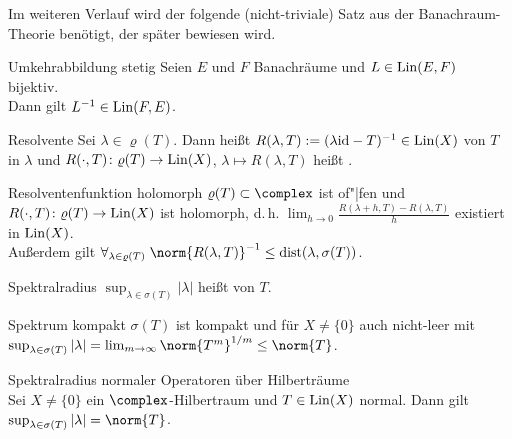 \linie

\begin{Bem}
    Im weiteren Verlauf wird der folgende (nicht-triviale) Satz aus der Banachraum-Theorie
    benötigt, der später bewiesen wird.
\end{Bem}

\begin{Satz}{Umkehrabbildung stetig}
    Seien $E$ und $F$ Banachräume und $L \in \operatorname{Lin}(E, F)$ bijektiv.\\
    Dann gilt $L^{-1} \in \operatorname{Lin}(F, E)$.
\end{Satz}

\begin{Def}{Resolvente}
    Sei $\lambda \in \varrho(T)$.
    Dann heißt $R(\lambda, T) := (\lambda\text{id} - T)^{-1} \in \operatorname{Lin}(X)$
     von $T$ in $\lambda$ und
    $R(\cdot, T)\colon \varrho(T) \rightarrow \operatorname{Lin}(X)$,
    $\lambda \mapsto R(\lambda, T)$ heißt .
\end{Def}


\begin{Satz}{Resolventenfunktion holomorph}
    $\varrho(T) \subset \complex$ ist of"|fen und
    $R(\cdot, T)\colon \varrho(T) \rightarrow \operatorname{Lin}(X)$ ist holomorph, d.\,h.
    $\lim_{h \to 0} \frac{R(\lambda + h, T) - R(\lambda, T)}{h}$ existiert in $\operatorname{Lin}(X)$.\\
    Außerdem gilt $\forall_{\lambda \in \varrho(T)}\;
    \norm{R(\lambda, T)}^{-1} \le \dist(\lambda, \sigma(T))$.
\end{Satz}

\linie

\begin{Def}{Spektralradius}
    $\sup_{\lambda \in \sigma(T)} |\lambda|$ heißt  von $T$.
\end{Def}

\begin{Satz}{Spektrum kompakt}
    $\sigma(T)$ ist kompakt und für $X \not= \{0\}$ auch nicht-leer mit\\
    $\sup_{\lambda \in \sigma(T)} |\lambda| = \lim_{m \to \infty} \norm{T^m}^{1/m} \le \norm{T}$.
\end{Satz}

\begin{Satz}{Spektralradius normaler Operatoren über Hilberträume}\\
    Sei $X \not= \{0\}$ ein $\complex$-Hilbertraum und
    $T \in \operatorname{Lin}(X)$ normal.
    Dann gilt $\sup_{\lambda \in \sigma(T)} |\lambda| = \norm{T}$.
\end{Satz}

